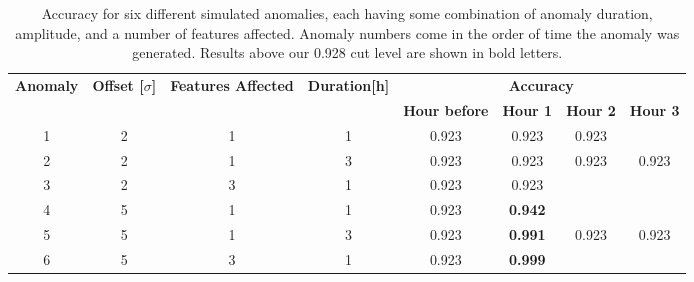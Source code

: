 \documentclass[5p]{elsarticle}
\begin{document}
\begin{table}[htbp]
\centering
\caption{Accuracy for six different simulated anomalies, each having some combination of anomaly duration, amplitude, and a number of features affected. Anomaly numbers come in the order of time the anomaly was generated. Results above our 0.928 cut level are shown in bold letters.}
\label{table:nntonfixed}
\resizebox{\linewidth}{!} {%
\begin{tabular}{@{}cccccccc@{}}
\toprule
\multirow{2}{*}{\textbf{Anomaly}} & \multirow{2}{*}{\textbf{Offset {[}$\sigma${]}}} & \multirow{2}{*}{\textbf{Features Affected}} & \multirow{2}{*}{\textbf{Duration{[}h{]}}} & \multicolumn{4}{c}{\textbf{Accuracy}}                                     \\ \cmidrule(l){5-8} 
                                  &                                                 &                                             &                                           & \textbf{Hour before} & \textbf{Hour 1} & \textbf{Hour 2} & \textbf{Hour 3} \\ \midrule
1                                 & 2                                               & 1                                           & 1                                         & 0.923                & 0.923  &     0.923            &                 \\
2                                 & 2                                               & 1                                           & 3                                         & 0.923                & 0.923  & 0.923  & 0.923           \\
3                                 & 2                                               & 3                                           & 1                                         & 0.923                & 0.923  &                 &                 \\
4                                 & 5                                               & 1                                           & 1                                         & 0.923                & \textbf{0.942}  &                 &                 \\
5                                 & 5                                               & 1                                           & 3                                         & 0.923                & \textbf{0.991}  & 0.923  & 0.923           \\
6                                 & 5                                               & 3                                           & 1                                         & 0.923                & \textbf{0.999}  &                 &                 \\ 
\bottomrule
\end{tabular}%
}
\end{table}
\end{document}
